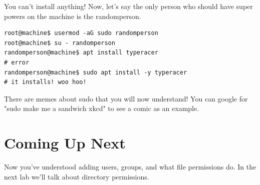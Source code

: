 \documentclass[12pt,a4]{article}
\begin{document}
You can't install anything! Now, let's say the only person who should have super powers on the machine is the randomperson.

\begin{lstlisting}[style=Term, label=listing:awk, caption={sudo}]
root@machine$ usermod -aG sudo randomperson
root@machine$ su - randomperson
randomperson@machine$ apt install typeracer
# error
randomperson@machine$ sudo apt install -y typeracer
# it installs! woo hoo!
\end{lstlisting}

There are memes about sudo that you will now understand! You can google for "sudo make me a sandwich xkcd" to see a comic as an example.


\newpage

\section{Coming Up Next}
Now you've understood adding users, groups, and what file permissions do. In the next lab we'll talk about directory permissions.
\end{document}
